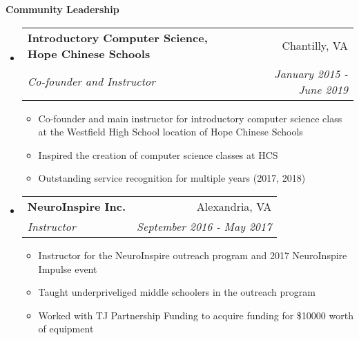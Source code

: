 \documentclass[letterpaper,11pt]{article}
\makeatletter
\newcommand{\resitem}[1]{\item #1 \vspace{-2pt}}
\newcommand{\resheading}[1]{{\large \colorbox{mygrey}{\begin{minipage}{\textwidth}{\textbf{#1 \vphantom{p\^{E}}}}\end{minipage}}}}
\newcommand{\ressubheading}[4]{
\begin{tabular*}{7.0in}{l@{\extracolsep{\fill}}r}
		\textbf{#1} & #2 \\
		\textit{#3} & \textit{#4} \\
\end{tabular*}\vspace{-6pt}}
\makeatother
\begin{document}
\resheading{Community Leadership}
\begin{itemize}
\item
	\ressubheading{Introductory Computer Science, Hope Chinese Schools}{Chantilly, VA}{Co-founder and Instructor}{January 2015 - June 2019}
	\begin{itemize}
		\resitem{Co-founder and main instructor for introductory computer science class at the Westfield High School location of Hope Chinese Schools}
		\resitem{Inspired the creation of computer science classes at HCS}
	    \resitem{Outstanding service recognition for multiple years (2017, 2018)}
	\end{itemize}
\item
	\ressubheading{NeuroInspire Inc.}{Alexandria, VA}{Instructor}{September 2016 - May 2017}
	\begin{itemize}
		\resitem{Instructor for the NeuroInspire outreach program and 2017 NeuroInspire Impulse event}
		\resitem{Taught underpriveliged middle schoolers in the outreach program}
		\resitem{Worked with TJ Partnership Funding to acquire funding for \$10000 worth of equipment}
	\end{itemize}
	
\end{itemize}
\end{document}
